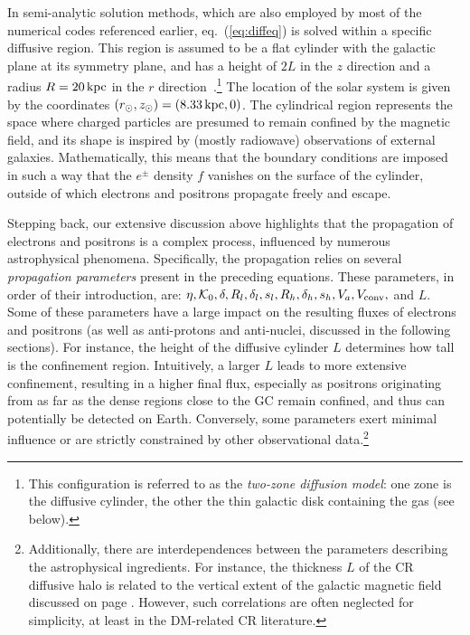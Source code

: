 \medskip

In semi-analytic solution methods, which are also employed by most of the numerical codes referenced earlier,
eq.~(\ref{eq:diffeq}) is solved within a specific diffusive region. 
This region is assumed to be a flat cylinder with the galactic plane at its symmetry plane, and has a height of $2L$ in the $z$ direction and a radius $R = 20\, {\rm kpc}$ in the $r$ direction~\cite{CRpropagation}.\footnote{This configuration is referred to as the {\em two-zone diffusion model}: one zone is the diffusive cylinder, the other the thin galactic disk containing the gas (see below).}
 The location of the solar system is given by the coordinates $(r_{\odot}, z_{\odot}) = (8.33\, {\rm kpc}, 0)$.
The cylindrical region represents the space where charged particles are presumed to remain confined by the magnetic field, and its shape is inspired by (mostly radiowave) observations of external galaxies.  
Mathematically, this means that the boundary conditions are imposed in such a way that the $e^\pm$ density $f$ vanishes on the surface of the cylinder, outside of which electrons and positrons propagate freely and escape. 




\medskip

Stepping back, our extensive discussion above highlights that the propagation of electrons and positrons is a complex process, influenced by numerous astrophysical phenomena. 
Specifically, the propagation relies on several \emph{propagation parameters} present in the preceding equations. 
These parameters, in order of their introduction, are: $\eta, \mathcal{K}_0, \delta, R_l, \delta_l, s_l, R_h, \delta_h, s_h, V_a, V_{\rm conv},$ and $L$.
Some of these parameters have a large impact on the resulting fluxes of electrons and positrons (as well as anti-protons and anti-nuclei, discussed in the following sections). 
For instance, the height of the diffusive cylinder $L$ determines how tall is the confinement region. 
 Intuitively, a larger $L$ leads to more extensive confinement, resulting in a higher final flux, especially as positrons originating from as far as the dense regions close to the GC remain confined, and thus can potentially be detected on Earth. 
Conversely, some parameters exert minimal influence or are strictly constrained by other observational data.\footnote{
Additionally, there are interdependences between the parameters describing the astrophysical ingredients. For instance, the thickness $L$ of the CR diffusive halo is related to the vertical extent of the galactic magnetic field discussed on page \pageref{galacticB}. However, such correlations are often neglected for simplicity, at least in the DM-related CR literature.
} 

